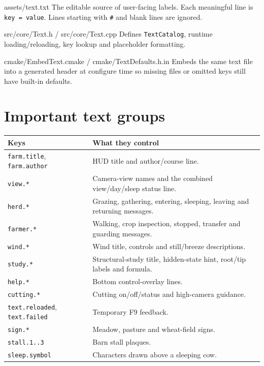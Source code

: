 \documentclass[11pt,a4paper,openany]{book}
\newcommand{\code}[1]{\texttt{#1}}
\begin{document}
\begin{filebox}{assets/text.txt}
	The editable source of user-facing labels. Each meaningful line is \code{key = value}. Lines starting with \code{\#} and blank lines are ignored.
\end{filebox}
\begin{filebox}{src/core/Text.h / src/core/Text.cpp}
	Defines \code{TextCatalog}, runtime loading/reloading, key lookup and placeholder formatting.
\end{filebox}
\begin{filebox}{cmake/EmbedText.cmake / cmake/TextDefaults.h.in}
	Embeds the same text file into a generated header at configure time so missing files or omitted keys still have built-in defaults.
\end{filebox}

\section{Important text groups}
\begin{longtable}{@{}p{}p{}@{}}
	\toprule
	Keys                                     & What they control                                                       \\
	\midrule
	\endhead
	\code{farm.title}, \code{farm.author}    & HUD title and author/course line.                                       \\
	\code{view.*}                            & Camera-view names and the combined view/day/sleep status line.          \\
	\code{herd.*}                            & Grazing, gathering, entering, sleeping, leaving and returning messages. \\
	\code{farmer.*}                          & Walking, crop inspection, stopped, transfer and guarding messages. \\
	\code{wind.*}                            & Wind title, controls and still/breeze descriptions.                     \\
	\code{study.*}                           & Structural-study title, hidden-state hint, root/tip labels and formula. \\
	\code{help.*}                            & Bottom control-overlay lines.                                           \\
	\code{cutting.*}                         & Cutting on/off/status and high-camera guidance.                         \\
	\code{text.reloaded}, \code{text.failed} & Temporary F9 feedback.                                                  \\
	\code{sign.*}                            & Meadow, pasture and wheat-field signs.                                  \\
	\code{stall.1..3}                        & Barn stall plaques.                                                     \\
	\code{sleep.symbol}                      & Characters drawn above a sleeping cow.                                  \\
	\bottomrule
\end{longtable}
\end{document}
